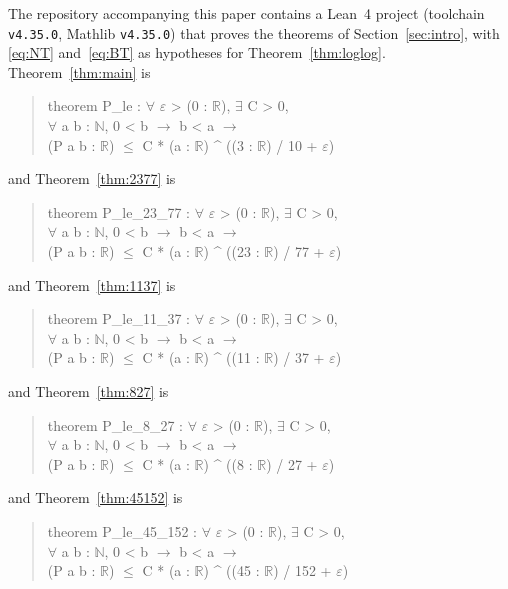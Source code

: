 \documentclass[11pt]{amsart}
\theoremstyle{definition}
\theoremstyle{remark}
\newcommand{\lean}[1]{\texttt{#1}}
\begin{document}
The repository accompanying this paper contains a Lean~4 project (toolchain
\lean{v4.35.0}, Mathlib \lean{v4.35.0}) that proves the theorems of
Section~\ref{sec:intro}, with \eqref{eq:NT} and~\eqref{eq:BT} as hypotheses for
Theorem~\ref{thm:loglog}. Theorem~\ref{thm:main} is
\begin{quote}\ttfamily\small
theorem P\_le : $\forall$ $\varepsilon$ > (0 : $\mathbb R$), $\exists$ C > 0,\\
\hspace*{2em}$\forall$ a b : $\mathbb N$, 0 < b $\to$ b < a $\to$\\
\hspace*{2em}(P a b : $\mathbb R$) $\le$ C * (a : $\mathbb R$) \^{} ((3 : $\mathbb R$) / 10 + $\varepsilon$)
\end{quote}
and Theorem~\ref{thm:2377} is
\begin{quote}\ttfamily\small
theorem P\_le\_23\_77 : $\forall$ $\varepsilon$ > (0 : $\mathbb R$), $\exists$ C > 0,\\
\hspace*{2em}$\forall$ a b : $\mathbb N$, 0 < b $\to$ b < a $\to$\\
\hspace*{2em}(P a b : $\mathbb R$) $\le$ C * (a : $\mathbb R$) \^{} ((23 : $\mathbb R$) / 77 + $\varepsilon$)
\end{quote}
and Theorem~\ref{thm:1137} is
\begin{quote}\ttfamily\small
theorem P\_le\_11\_37 : $\forall$ $\varepsilon$ > (0 : $\mathbb R$), $\exists$ C > 0,\\
\hspace*{2em}$\forall$ a b : $\mathbb N$, 0 < b $\to$ b < a $\to$\\
\hspace*{2em}(P a b : $\mathbb R$) $\le$ C * (a : $\mathbb R$) \^{} ((11 : $\mathbb R$) / 37 + $\varepsilon$)
\end{quote}
and Theorem~\ref{thm:827} is
\begin{quote}\ttfamily\small
theorem P\_le\_8\_27 : $\forall$ $\varepsilon$ > (0 : $\mathbb R$), $\exists$ C > 0,\\
\hspace*{2em}$\forall$ a b : $\mathbb N$, 0 < b $\to$ b < a $\to$\\
\hspace*{2em}(P a b : $\mathbb R$) $\le$ C * (a : $\mathbb R$) \^{} ((8 : $\mathbb R$) / 27 + $\varepsilon$)
\end{quote}
and Theorem~\ref{thm:45152} is
\begin{quote}\ttfamily\small
theorem P\_le\_45\_152 : $\forall$ $\varepsilon$ > (0 : $\mathbb R$), $\exists$ C > 0,\\
\hspace*{2em}$\forall$ a b : $\mathbb N$, 0 < b $\to$ b < a $\to$\\
\hspace*{2em}(P a b : $\mathbb R$) $\le$ C * (a : $\mathbb R$) \^{} ((45 : $\mathbb R$) / 152 + $\varepsilon$)
\end{quote}
\end{document}
